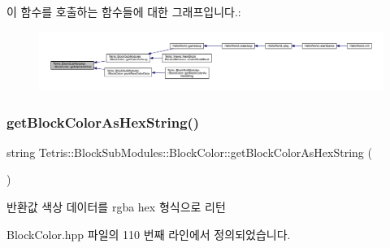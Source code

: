 이 함수를 호출하는 함수들에 대한 그래프입니다.\+:
\nopagebreak
\begin{figure}[H]
\begin{center}
\leavevmode
\includegraphics[width=350pt]{class_tetris_1_1_block_sub_modules_1_1_block_color_acb1c9b34ee534857741025bd2824201a_icgraph}
\end{center}
\end{figure}
\mbox{\label{class_tetris_1_1_block_sub_modules_1_1_block_color_a79cc837f207645628542876997c9e919}} 
\subsubsection{\texorpdfstring{get\+Block\+Color\+As\+Hex\+String()}{getBlockColorAsHexString()}}
{\footnotesize\ttfamily string Tetris\+::\+Block\+Sub\+Modules\+::\+Block\+Color\+::get\+Block\+Color\+As\+Hex\+String (\begin{DoxyParamCaption}{ }\end{DoxyParamCaption})\hspace{0.3cm}{\ttfamily [inline]}}

\begin{DoxyReturn}{반환값}
색상 데이터를 rgba hex 형식으로 리턴 
\end{DoxyReturn}


Block\+Color.\+hpp 파일의 110 번째 라인에서 정의되었습니다.

